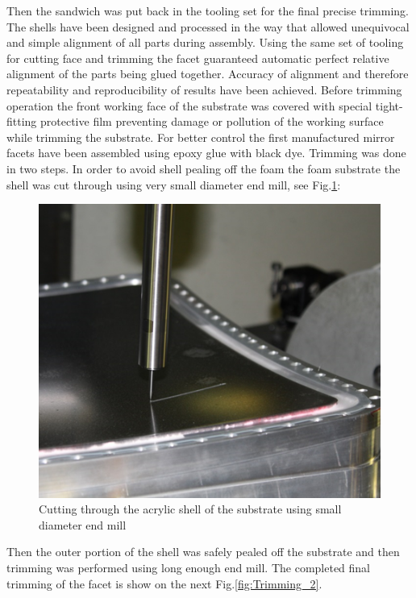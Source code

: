 Then the sandwich was put back in the tooling set for the final precise trimming. The shells have been designed and processed in the way that allowed  unequivocal and simple alignment of all parts during assembly. Using the same set of tooling for cutting face and trimming the facet guaranteed automatic perfect relative alignment of the parts being glued together. Accuracy of alignment and therefore repeatability and reproducibility of results have been achieved. Before trimming operation the front working face of the substrate was covered with special tight-fitting protective film preventing damage or pollution of the working surface while trimming the substrate. For better control the first manufactured mirror facets have been assembled using epoxy glue with black dye. Trimming was done in two steps. In order to avoid shell pealing off the foam the foam substrate the shell was cut through using very small diameter end mill, see Fig.\ref{fig:Trimming_1}:
\begin{figure}[h]
    \centering
    \includegraphics[width=1.0\linewidth]{Trimming_1}
    \caption{Cutting through the acrylic shell of the substrate using small diameter end mill}
    \label{fig:Trimming_1}
\end{figure}{}
Then the outer portion of the shell was safely pealed off the substrate and then trimming was performed using long enough end mill. The completed final trimming of the facet is show on the next Fig.\ref{fig:Trimming_2}.

